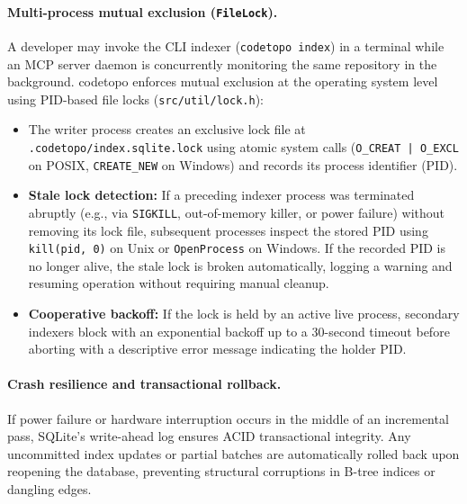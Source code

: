 \paragraph{Multi-process mutual exclusion (\texttt{FileLock}).} A developer may invoke the CLI indexer (\texttt{codetopo index})
in a terminal while an MCP server daemon is concurrently monitoring the same repository in the background.
codetopo enforces mutual exclusion at the operating system level using PID-based file locks (\texttt{src/util/lock.h}):
\begin{itemize}
  \item The writer process creates an exclusive lock file at \texttt{.codetopo/index.sqlite.lock} using atomic system calls
        (\texttt{O\_CREAT | O\_EXCL} on POSIX, \texttt{CREATE\_NEW} on Windows) and records its process identifier (PID).
  \item \textbf{Stale lock detection:} If a preceding indexer process was terminated abruptly (e.g., via \texttt{SIGKILL},
        out-of-memory killer, or power failure) without removing its lock file, subsequent processes inspect the stored PID
        using \texttt{kill(pid, 0)} on Unix or \texttt{OpenProcess} on Windows. If the recorded PID is no longer alive, the
        stale lock is broken automatically, logging a warning and resuming operation without requiring manual cleanup.
  \item \textbf{Cooperative backoff:} If the lock is held by an active live process, secondary indexers block with an exponential
        backoff up to a 30-second timeout before aborting with a descriptive error message indicating the holder PID.
\end{itemize}

\paragraph{Crash resilience and transactional rollback.} If power failure or hardware interruption occurs in the middle
of an incremental pass, SQLite's write-ahead log ensures ACID transactional integrity. Any uncommitted index updates or
partial batches are automatically rolled back upon reopening the database, preventing structural corruptions in B-tree
indices or dangling edges.
